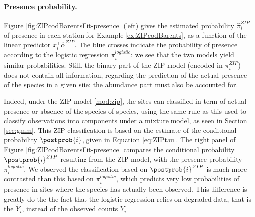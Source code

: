 \paragraph{Presence probability.}
Figure \ref{fig:ZIPcodBarentsFit-presence} (left) gives the estimated probability $\widehat{\pi}_i^{ZIP}$ of presence in each station for Example \ref{ex:ZIPcodBarents}, as a function of the linear predictor $x_i^\top \widehat{\alpha}^{ZIP}$. The blue crosses indicate the probability of presence according to the logistic regression $\pi_i^{logistic}$: we see that the two models yield similar probabilities. Still, the binary part of the ZIP model (encoded in $\pi_i^{ZIP}$) does not contain all information, regarding the prediction of the actual presence of the species in a given site: the abundance part must also be accounted for.

Indeed, under the ZIP model \eqref{mod:zip}, the sites can classified in term of actual presence or absence of the species of species, using the same rule as this used to classify observations into components under a mixture model, as seen in Section \ref{sec:gmm}. This ZIP classification is based on the estimate of the conditional probability $\postprob{i}$, given in Equation \eqref{eq:ZIPtau}. The right panel of Figure \ref{fig:ZIPcodBarentsFit-presence} compares the conditional probability $\postprob{i}^{ZIP}$ resulting from the ZIP model, with the presence probability $\pi_i^{logistic}$. We observed the classification based on $\postprob{i}^{ZIP}$ is much more contrasted than this based on $\pi_i^{logistic}$, which predicts very low probabilities of presence in sites where the species has actually been observed. This difference is greatly do the the fact that the logistic regression relies on degraded data, that is the $\widetilde{Y}_i$, instead of the observed counts $Y_i$.

